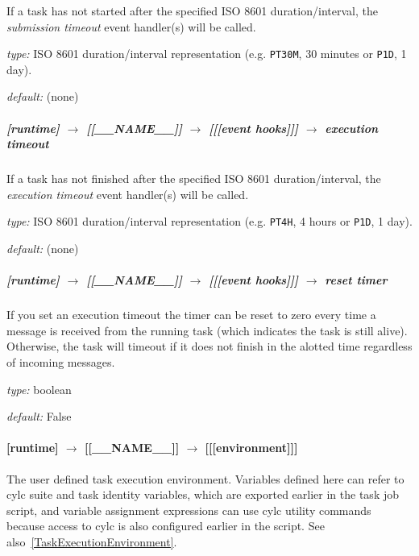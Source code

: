If a task has not started after the specified ISO 8601 duration/interval, the
{\em submission timeout} event handler(s) will be called.
\begin{myitemize}
    \item {\em type:} ISO 8601 duration/interval representation (e.g.
 \lstinline=PT30M=, 30 minutes or \lstinline=P1D=, 1 day).
    \item {\em default:} (none)
\end{myitemize}

\subparagraph[execution timeout]{[runtime] $\rightarrow$ [[\_\_NAME\_\_]] $\rightarrow$ [[[event hooks]]] $\rightarrow$ execution timeout}

If a task has not finished after the specified ISO 8601 duration/interval, the
{\em execution timeout} event handler(s) will be called.
\begin{myitemize}
    \item {\em type:} ISO 8601 duration/interval representation (e.g.
 \lstinline=PT4H=, 4 hours or \lstinline=P1D=, 1 day).
    \item {\em default:} (none)
\end{myitemize}

\subparagraph[reset timer]{[runtime] $\rightarrow$ [[\_\_NAME\_\_]] $\rightarrow$ [[[event hooks]]] $\rightarrow$ reset timer}

If you set an execution timeout the timer can be reset to zero every
time a message is received from the running task (which indicates the
task is still alive).  Otherwise, the task will timeout if it does not
finish in the alotted time regardless of incoming messages.

\begin{myitemize}
\item {\em type:} boolean
\item {\em default:} False
\end{myitemize}

\paragraph[{[[[}environment{]]]}]{[runtime] $\rightarrow$ [[\_\_NAME\_\_]] $\rightarrow$ [[[environment]]]}

The user defined task execution environment. Variables defined here can
refer to cylc suite and task identity variables, which are exported
earlier in the task job script, and variable assignment expressions can
use cylc utility commands because access to cylc is also configured
earlier in the script.  See also~\ref{TaskExecutionEnvironment}.

